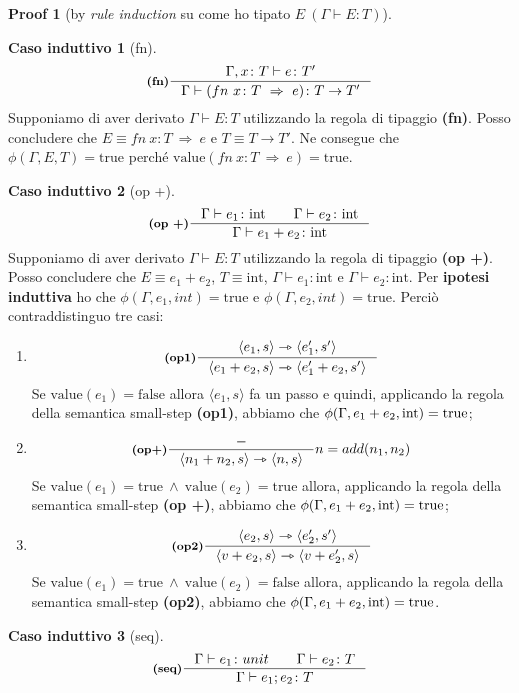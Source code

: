 \documentclass[a4paper, 10pt]{article}
\newcommand{\integer}{\textup{int}}
\theoremstyle{definition}
\newtheorem{prf}{Proof}[]
\newtheorem{ind}{Caso induttivo}
\newcommand{\infer}[4]{\inference[\textbf{#1}]{#2}{#3}#4 }
\newcommand{\srule}[2]{\langle #1 \rangle \rightarrowtriangle \langle #2 \rangle}
\begin{document}
\begin{multicols}{2}
\begin{prf}[by \textit{rule induction} su come ho tipato $ E\ (\Gamma \vdash E\colon T) $]
	\begin{ind}[fn]
		\[
			\infer{(fn)}{\Gamma , x \colon T \vdash e\colon T'}{\Gamma\vdash (fn\ x\colon T\ \Rightarrow\ e )\colon T\rightarrow T'}{}
		\]
		Supponiamo di aver derivato $ \Gamma \vdash E\colon T $ utilizzando la regola di tipaggio \textbf{(fn)}. Posso concludere che $ E\equiv fn\ x\colon T\ \Rightarrow\ e $ e $ T\equiv T\rightarrow T' $. Ne consegue che $ \phi (\Gamma, E, T) = \text{true} $ perché $ \text{value}(fn\ x\colon T\ \Rightarrow\ e) = \text{true} $.
	\end{ind}
	\begin{ind}[op +]
		\[
			\infer{(op +)}{\Gamma \vdash e_1\colon \integer\qquad \Gamma \vdash e_2\colon \integer}{\Gamma\vdash e_1 + e_2 \colon \integer}{}
		\]
		Supponiamo di aver derivato $ \Gamma \vdash E\colon T $ utilizzando la regola di tipaggio \textbf{(op +)}. Posso concludere che $ E\equiv e_1 + e_2 $, $ T\equiv \text{int} $, $ \Gamma\vdash e_1 \colon \text{int} $ e $ \Gamma\vdash e_2 \colon \text{int} $. Per \textbf{ipotesi induttiva} ho che $ \phi(\Gamma, e_1, int)= \text{true} $ e $ \phi(\Gamma, e_2, int)= \text{true} $. Perciò contraddistinguo tre casi:
		\begin{enumerate}
			\item 
			\[
				\infer{(op1)}{\srule{e_1,s}{e_1', s'}}{\srule{e_1 + e_2,s}{e_1' + e_2,s'}}{}
			\]
			Se $ \text{value}(e_1) = \text{false} $ allora $ \langle e_1, s \rangle $ fa un passo e quindi, applicando la regola della semantica small-step \textbf{(op1)}, abbiamo che $ \phi(\Gamma, e_1 + e_2, \text{int}) = \textup{true} $;
			\item
			\[
				\infer{(op+)}{-}{\srule{n_1 + n_2,s}{n,s}}{n=add(n_1,n_2)}
			\]
			Se $ \text{value}(e_1) = \text{true}\ \wedge\ \text{value}(e_2) = \text{true} $ allora, applicando la regola della semantica small-step \textbf{(op +)}, abbiamo che $ \phi(\Gamma, e_1 + e_2, \text{int}) = \textup{true} $;
			\item 
			\[
				\infer{(op2)}{\srule{e_2,s}{e_2', s'}}{\srule{v + e_2,s}{v + e_2',s}}{}
			\]
			Se $ \text{value}(e_1) = \text{true}\ \wedge\ \text{value}(e_2) = \text{false} $ allora, applicando la regola della semantica small-step \textbf{(op2)}, abbiamo che $ \phi(\Gamma, e_1 + e_2, \text{int}) = \textup{true} $.
		\end{enumerate}
	\end{ind}
	\begin{ind}[seq]
		\[
			\infer{(seq)}{\Gamma \vdash e_1\colon unit \qquad \Gamma\vdash e_2\colon T}{\Gamma \vdash e_1;e_2\colon T}{}
\]
\end{ind}
\end{prf}
\end{multicols}
\end{document}
